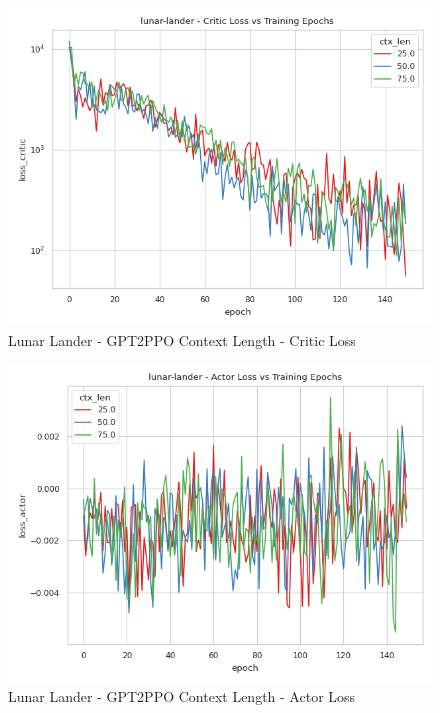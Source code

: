 \documentclass[conference]{IEEEtran}
\begin{document}
\begin{figure}[htbp]
    \centerline{\includegraphics[width=\columnwidth]{./img/lunar-lander-loss_critic-ctx_len.png}}
    \caption{Lunar Lander - GPT2PPO Context Length - Critic Loss}
    \label{lunar-lander-loss_critic-ctx_len}
\end{figure}

\begin{figure}[htbp]
    \centerline{\includegraphics[width=\columnwidth]{./img/lunar-lander-loss_actor-ctx_len.png}}
    \caption{Lunar Lander - GPT2PPO Context Length - Actor Loss}
    \label{lunar-lander-loss_actor-ctx_len}
\end{figure}
\end{document}
